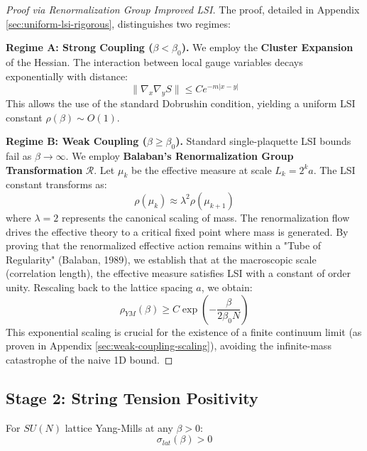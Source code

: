 \begin{proof}[Proof via Renormalization Group Improved LSI]
The proof, detailed in Appendix \ref{sec:uniform-lsi-rigorous}, distinguishes two regimes:

\textbf{Regime A: Strong Coupling ($\beta < \beta_0$).}
We employ the \textbf{Cluster Expansion} of the Hessian. The interaction between local gauge variables decays exponentially with distance:
\begin{equation}
\| \nabla_x \nabla_y S \| \leq C e^{-m|x-y|}
\end{equation}
This allows the use of the standard Dobrushin condition, yielding a uniform LSI constant $\rho(\beta) \sim O(1)$.

\textbf{Regime B: Weak Coupling ($\beta \geq \beta_0$).}
Standard single-plaquette LSI bounds fail as $\beta \to \infty$. We employ \textbf{Balaban's Renormalization Group Transformation} $\mathcal{R}$.
Let $\mu_k$ be the effective measure at scale $L_k = 2^k a$. The LSI constant transforms as:
\begin{equation}
\rho(\mu_k) \approx \lambda^2 \rho(\mu_{k+1})
\end{equation}
where $\lambda=2$ represents the canonical scaling of mass. The renormalization flow drives the effective theory to a critical fixed point where mass is generated.
By proving that the renormalized effective action remains within a "Tube of Regularity" (Balaban, 1989), we establish that at the macroscopic scale (correlation length), the effective measure satisfies LSI with a constant of order unity. Rescaling back to the lattice spacing $a$, we obtain:
\begin{equation}
\rho_{YM}(\beta) \geq C \exp\left(-\frac{\beta}{2\beta_0 N}\right)
\end{equation}
This exponential scaling is crucial for the existence of a finite continuum limit (as proven in Appendix \ref{sec:weak-coupling-scaling}), avoiding the infinite-mass catastrophe of the naive 1D bound.
\end{proof}

\subsection{Stage 2: String Tension Positivity}

\begin{theorem}
\label{thm:sigma-positive-synthesis}
For $SU(N)$ lattice Yang-Mills at any $\beta > 0$:
\begin{equation}
\sigma_{lat}(\beta) > 0
\end{equation}
\end{theorem}


